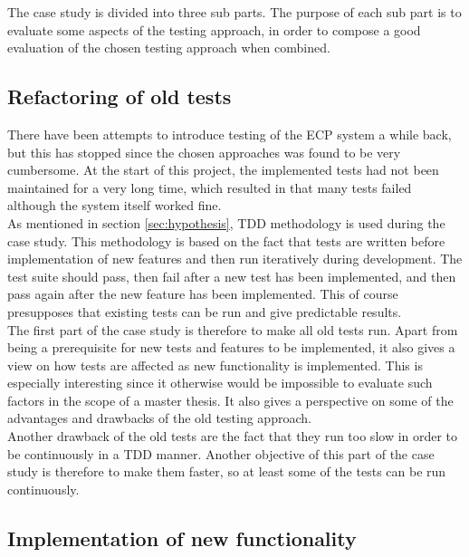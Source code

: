 
The case study is divided into three sub parts. The purpose of each
sub part is to evaluate some aspects of the testing approach, in order
to compose a good evaluation of the chosen testing approach when
combined.\\


\subsection{Refactoring of old tests}

There have been attempts to introduce testing of the ECP system a while
back, but this has stopped since the chosen approaches was found to be
very cumbersome. At the start of this project, the implemented tests had
not been maintained for a very long time, which resulted in that many
tests failed although the system itself worked fine.\\

As mentioned in section \ref{sec:hypothesis}, TDD methodology is
used during the case study. This methodology is based on the fact that
tests are written before implementation of new features and then run
iteratively during development. The test suite should pass, then fail
after a new test has been implemented, and then pass again after the new
feature has been implemented. This of course presupposes that existing
tests can be run and give predictable results.\\

The first part of the case study is therefore to make all old tests run.
Apart from being a prerequisite for new tests and features to be
implemented, it also gives a view on how tests are affected as new
functionality is implemented. This is especially interesting since it
otherwise would be impossible to evaluate such factors in the scope of a
master thesis. It also gives a perspective on some of the advantages
and drawbacks of the old testing approach.\\

Another drawback of the old tests are the fact that they run too slow in
order to be continuously in a TDD manner. Another objective of this part
of the case study is therefore to make them faster, so at least some of
the tests can be run continuously.\\


\subsection{Implementation of new functionality}

